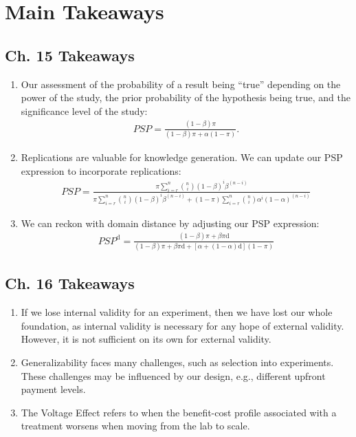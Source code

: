 \documentclass[10pt]{article}
\begin{document}

\section{Main Takeaways}

\subsection{Ch. 15 Takeaways}

\begin{enumerate}
    \item Our assessment of the probability of a result 
        being ``true'' depending on the power of the study,
        the prior probability of the hypothesis being true,
        and the significance level of the study:
        \begin{align}
            P S P=\frac{(1-\beta) \pi}{(1-\beta) \pi+\alpha(1-\pi)} .
        \end{align}
    \item Replications are valuable for knowledge generation. 
        We can update our PSP expression to incorporate replications:
        \begin{align}
            P S P=\frac{\pi \sum_{i=r}^n\binom{n}{i}(1-\beta)^i \beta^{(n-i)}}{\pi \sum_{i=r}^n\binom{n}{i}(1-\beta)^i \beta^{(n-i)}+(1-\pi) \sum_{i=r}^n\binom{n}{i} \alpha^i(1-\alpha)^{(n-i)}}
        \end{align}
    \item We can reckon with domain distance by adjusting our PSP expression:
        \begin{align}
            P S P^{\mathrm{d}}=\frac{(1-\beta) \pi+\beta \pi \mathrm{d}}{(1-\beta) \pi+\beta \pi \mathrm{d}+[\alpha+(1-\alpha) \mathrm{d}](1-\pi)}
        \end{align}
\end{enumerate}

\subsection{Ch. 16 Takeaways}

\begin{enumerate}
    \item If we lose internal validity for an experiment, 
        then we have lost our whole foundation, as 
        internal validity is necessary for any hope of external 
        validity. However, it is not sufficient on its own
        for external validity.
    \item Generalizability faces many challenges, such 
        as selection into experiments. These challenges 
        may be influenced by our design, e.g., 
        different upfront payment levels.
    \item The Voltage Effect refers to when the benefit-cost profile 
        associated with a treatment worsens 
        when moving from the lab to scale.
\end{enumerate}
\end{document}
